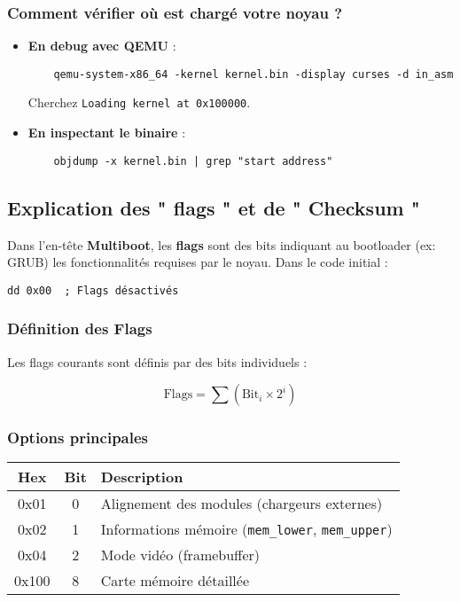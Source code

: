 \documentclass{article}
\begin{document}
\subsubsection*{Comment vérifier où est chargé votre noyau ?}
\begin{itemize}
    \item \textbf{En debug avec QEMU} :
    \begin{verbatim}
    qemu-system-x86_64 -kernel kernel.bin -display curses -d in_asm
    \end{verbatim}
    Cherchez \texttt{Loading kernel at 0x100000}.
    
    \item \textbf{En inspectant le binaire} :
    \begin{verbatim}
    objdump -x kernel.bin | grep "start address"
    \end{verbatim}
\end{itemize}















\subsection*{Explication des " flags " et de " Checksum "}
Dans l'en-tête \textbf{Multiboot}, les \textbf{flags} sont des bits indiquant au bootloader (ex: GRUB) les fonctionnalités requises par le noyau. Dans le code initial :
\begin{figure}
    \label{fig:flags}
\end{figure}
\begin{verbatim}
dd 0x00  ; Flags désactivés
\end{verbatim}

\subsubsection*{Définition des Flags}
Les flags courants sont définis par des bits individuels :

\[
\text{Flags} = \sum (\text{Bit}_i \times 2^i)
\]

\subsubsection*{Options principales}
\begin{tabular}{|c|c|l|}
\hline
\textbf{Hex} & \textbf{Bit} & \textbf{Description} \\
\hline
0x01 & 0 & Alignement des modules (chargeurs externes) \\
0x02 & 1 & Informations mémoire (\texttt{mem\_lower}, \texttt{mem\_upper}) \\
0x04 & 2 & Mode vidéo (framebuffer) \\
0x100 & 8 & Carte mémoire détaillée \\
\hline
\end{tabular}
\end{document}
